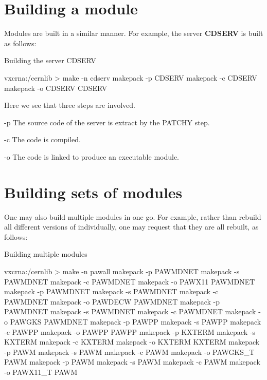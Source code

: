 \section{Building a module}

Modules are built in a similar manner. For example, the \HEPDB{}
server {\bf CDSERV} is built as follows:

\begin{XMPt}{Building the \HEPDB{} server CDSERV}

vxcrna:/cernlib > make -n cdserv
        makepack -p CDSERV 
        makepack -c CDSERV 
        makepack -o CDSERV  CDSERV 

\end{XMPt}

Here we see that three steps are involved.

\begin{DLtt}{12}
\item[-p]The source code of the server is extract by the PATCHY step.
\item[-c]The code is compiled.
\item[-o]The code is linked to produce an executable module.
\end{DLtt}

\section{Building sets of modules}

One may also build multiple modules in one go. For example,
rather than rebuild all different versions of \PAW{} individually,
one may request that they are all rebuilt, as follows:

\begin{XMPt}{Building multiple modules}

vxcrna:/cernlib > make -n pawall
        makepack -p PAWMDNET
        makepack -s PAWMDNET
        makepack -c PAWMDNET
        makepack -o PAWX11   PAWMDNET
        makepack -p PAWMDNET
        makepack -s PAWMDNET
        makepack -c PAWMDNET
        makepack -o PAWDECW  PAWMDNET
        makepack -p PAWMDNET
        makepack -s PAWMDNET
        makepack -c PAWMDNET
        makepack -o PAWGKS  PAWMDNET
        makepack -p PAWPP   
        makepack -s PAWPP   
        makepack -c PAWPP   
        makepack -o PAWPP    PAWPP   
        makepack -p KXTERM  
        makepack -s KXTERM  
        makepack -c KXTERM  
        makepack -o KXTERM   KXTERM
        makepack -p PAWM    
        makepack -s PAWM    
        makepack -c PAWM    
        makepack -o PAWGKS_T PAWM    
        makepack -p PAWM    
        makepack -s PAWM    
        makepack -c PAWM    
        makepack -o PAWX11_T PAWM    

\end{XMPt}

